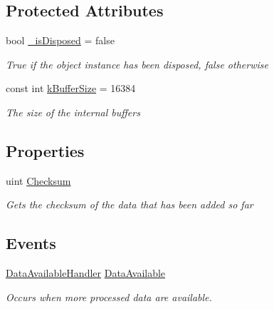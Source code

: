 \subsection*{Protected Attributes}
\begin{DoxyCompactItemize}
\item 
bool \hyperlink{class_dot_z_lib_1_1_codec_base_a9aa2d3961669aad672e43946c25ae24b}{\+\_\+is\+Disposed} = false
\begin{DoxyCompactList}\small\item\em True if the object instance has been disposed, false otherwise \end{DoxyCompactList}\item 
const int \hyperlink{class_dot_z_lib_1_1_codec_base_a6cf60968f7eaa921e5a8108e0ebcb880}{k\+Buffer\+Size} = 16384
\begin{DoxyCompactList}\small\item\em The size of the internal buffers \end{DoxyCompactList}\end{DoxyCompactItemize}
\subsection*{Properties}
\begin{DoxyCompactItemize}
\item 
uint \hyperlink{class_dot_z_lib_1_1_codec_base_aac848293ff53082bb60cb561daa6fd6b}{Checksum}
\begin{DoxyCompactList}\small\item\em Gets the checksum of the data that has been added so far \end{DoxyCompactList}\end{DoxyCompactItemize}
\subsection*{Events}
\begin{DoxyCompactItemize}
\item 
\hyperlink{namespace_dot_z_lib_a3aa323950a96dc02f6b94462d498bfef}{Data\+Available\+Handler} \hyperlink{class_dot_z_lib_1_1_codec_base_a985cf58f6ed5cfeeb9fd8c34a7c052d4}{Data\+Available}
\begin{DoxyCompactList}\small\item\em Occurs when more processed data are available. \end{DoxyCompactList}\end{DoxyCompactItemize}


